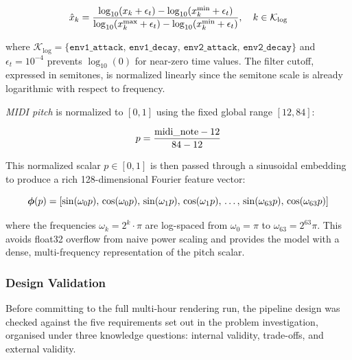 \begin{equation}
\hat{x}_k = \frac{\log_{10}(x_k + \epsilon_t) - \log_{10}(x_k^{\min} + \epsilon_t)}%
                 {\log_{10}(x_k^{\max} + \epsilon_t) - \log_{10}(x_k^{\min} + \epsilon_t)},
\quad k \in \mathcal{K}_{\log}
\label{eq:lognorm}\eqname{Envelope-time logarithmic normalisation}
\end{equation}

\noindent where $\mathcal{K}_{\log} = \{\texttt{env1\_attack},\, \texttt{env1\_decay},\, \texttt{env2\_attack},\, \texttt{env2\_decay}\}$ and $\epsilon_t = 10^{-4}$ prevents $\log_{10}(0)$ for near-zero time values. The filter cutoff, expressed in semitones, is normalized linearly since the semitone scale is already logarithmic with respect to frequency.

\par \vspace{0.3cm}
\textit{MIDI pitch} is normalized to $[0, 1]$ using the fixed global range $[12, 84]$:

\begin{equation}
p = \frac{\text{midi\_note} - 12}{84 - 12}
\label{eq:pitch_norm}\eqname{MIDI pitch normalisation}
\end{equation}

\noindent This normalized scalar $p \in [0, 1]$ is then passed through a sinusoidal embedding to produce a rich 128-dimensional Fourier feature vector:

\begin{equation}
\boldsymbol{\phi}(p) = \left[\sin(\omega_0 p),\, \cos(\omega_0 p),\, \sin(\omega_1 p),\, \cos(\omega_1 p),\, \ldots,\, \sin(\omega_{63} p),\, \cos(\omega_{63} p)\right]
\label{eq:sinusoidal}\eqname{Sinusoidal pitch embedding}
\end{equation}

\noindent where the frequencies $\omega_k = 2^k \cdot \pi$ are log-spaced from $\omega_0 = \pi$ to $\omega_{63} = 2^{63}\pi$. This avoids float32 overflow from naive power scaling and provides the model with a dense, multi-frequency representation of the pitch scalar.

\subsubsection{Design Validation}

\noindent
Before committing to the full multi-hour rendering run, the pipeline design was checked against the five requirements set out in the problem investigation, organised under three knowledge questions: internal validity, trade-offs, and external validity.

